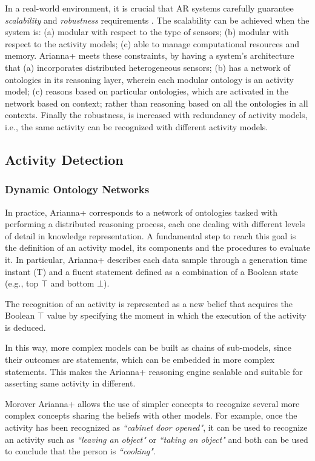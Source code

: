 \documentclass{thesisreport}
\begin{document}
In a real-world environment, it is crucial that AR systems carefully guarantee \textit{scalability} and \textit{robustness} requirements \cite{kareem2018arianna}.
The scalability can be achieved when the system is: (a) modular with respect to the type of sensors; (b) modular with respect to the activity models; (c) able to manage computational resources and memory. Arianna+ meets these constraints, by having a system's architecture that (a) incorporates distributed heterogeneous sensors; (b) has a network of ontologies in its reasoning layer, wherein each modular ontology is an activity model; (c) reasons based on particular ontologies, which are activated in the network based on context; rather than reasoning based on all the ontologies in all contexts.
Finally the robustness, is increased with redundancy of activity models, i.e., the same activity can be recognized with different activity models.

 \subsection{Activity Detection}
 \subsubsection{Dynamic Ontology Networks}
 In practice, Arianna+ corresponds to a network of ontologies tasked with performing a distributed reasoning process, each one dealing with different levels of detail in knowledge representation. 
 A fundamental step to reach this goal is  the definition of an activity model, its components and the procedures to evaluate it. In particular, Arianna+ describes each data sample through a generation time instant (T) and a fluent statement defined as a combination of a Boolean state (e.g., top $\top$ and bottom $\bot$).
 
 The recognition of an activity is represented as a new belief that acquires the Boolean $\top$ value by specifying the moment in which the execution of the activity is deduced.
 
 In this way, more complex models can be built as chains of sub-models, since their outcomes are statements, which can be embedded in more complex statements.
 This makes the Arianna+ reasoning engine scalable and suitable for asserting same activity in different.
 
Morover Arianna+ allows the use of simpler concepts to recognize several more complex concepts sharing the beliefs  with other models. For example, once the activity has been recognized as \textit{``cabinet door opened"}, it can be used to recognize an activity such as \textit{``leaving an object"} or \textit{``taking an object"} and both can be used to conclude that the person is \textit{``cooking"}.
\end{document}
